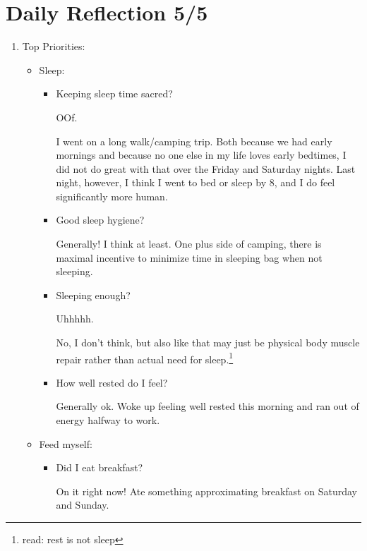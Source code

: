 \documentclass[12pt]{article}
\renewcommand{\,}{\textsuperscript{,}}
\begin{document}
\section{Daily Reflection 5/5}

\begin{enumerate}

\item Top Priorities:

\begin{itemize}

\item Sleep:

\begin{itemize}

\item Keeping sleep time sacred?

OOf.

I went on a long walk/camping trip.  
Both because we had early mornings and because no one else in my life loves early bedtimes, I did not do great with that over the Friday and Saturday nights.  
Last night, however, I think I went to bed or sleep by 8, and I do feel significantly more human.

\item Good sleep hygiene?

Generally! I think at least.  
One plus side of camping, there is maximal incentive to minimize time in sleeping bag when not sleeping.

\item Sleeping enough?

Uhhhhh.

No, I don't think, but also like that may just be physical body muscle repair rather than actual need for sleep.\footnote{read: rest is not sleep}

\item How well rested do I feel?

Generally ok.  
Woke up feeling well rested this morning and ran out of energy halfway to work.

\end{itemize}

\item Feed myself:

\begin{itemize}

\item Did I eat breakfast?

On it right now! Ate something approximating breakfast on Saturday and Sunday.


\end{itemize}
\end{itemize}
\end{enumerate}
\end{document}
